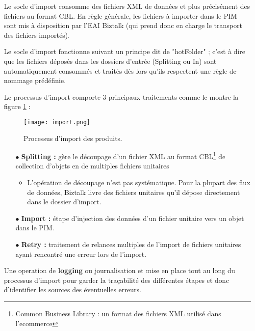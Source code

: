 \medskip

Le socle d'import consomme des fichiers XML de données et plus précisément des fichiers au format CBL. En règle générale, les fichiers à importer dans le PIM sont mis à disposition par l'EAI Biztalk (qui prend donc en charge le transport des fichiers importés).

\medskip

Le socle d'import fonctionne suivant un principe dit de "hotFolder" ; c'est à dire que les fichiers déposés dans les dossiers d'entrée (Splitting ou In) sont automatiquement consommés et traités dès lors qu'ils respectent une règle de nommage prédéfinie.

\medskip

Le processus d'import comporte 3 principaux traitements comme le montre la figure \ref{fig:import} :

\begin{figure}[ht]
  \centering
  \texttt{[image: import.png]}
  \caption{Processus d'import des produits.}
  \label{fig:import}
\end{figure}
\FloatBarrier

\begin{itemize}
    \item[$\bullet$] \textbf{Splitting :} gère le découpage d'un fichier XML au format CBL\footnote{Common Business Library : un format des fichiers XML utilisé dans l'ecommerce\cite{xcbl}} de collection d'objets en de multiples fichiers unitaires
    \smallskip
    \begin{itemize}
        \item L'opération de découpage n'est pas systématique. Pour la plupart des flux de données, Biztalk livre des fichiers unitaires qu'il dépose directement dans le dossier d'import.
    \end{itemize}
    \medskip
    \item[$\bullet$] \textbf{Import :} étape d'injection des données d'un fichier unitaire vers un objet dans le PIM.
    \medskip
    \item[$\bullet$] \textbf{Retry :} traitement de relances multiples de l'import de fichiers unitaires ayant rencontré une erreur lors de l'import.
\end{itemize}

Une operation de \textbf{logging} ou journalisation et mise en place tout au long du processus d'import pour garder la traçabilité des différentes étapes et donc d'identifier les sources des éventuelles erreurs.

